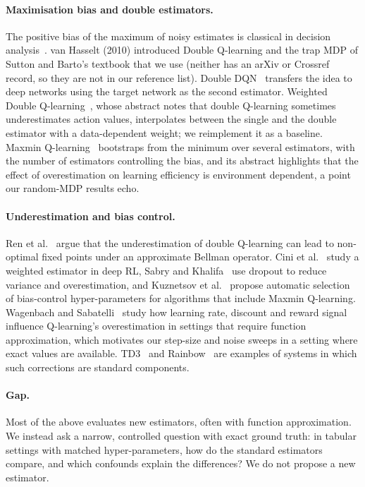 \paragraph{Maximisation bias and double estimators.} The positive bias of the maximum of noisy estimates is classical in decision analysis~\cite{smith2006optimizer}. van Hasselt (2010) introduced Double Q-learning and the trap MDP of Sutton and Barto's textbook that we use (neither has an arXiv or Crossref record, so they are not in our reference list). Double DQN~\cite{hasselt2015deep} transfers the idea to deep networks using the target network as the second estimator. Weighted Double Q-learning~\cite{zhang2017weighted}, whose abstract notes that double Q-learning sometimes underestimates action values, interpolates between the single and the double estimator with a data-dependent weight; we reimplement it as a baseline. Maxmin Q-learning~\cite{lan2020maxmin} bootstraps from the minimum over several estimators, with the number of estimators controlling the bias, and its abstract highlights that the effect of overestimation on learning efficiency is environment dependent, a point our random-MDP results echo.

\paragraph{Underestimation and bias control.} Ren et al.~\cite{ren2021estimation} argue that the underestimation of double Q-learning can lead to non-optimal fixed points under an approximate Bellman operator. Cini et al.~\cite{cini2020deep} study a weighted estimator in deep RL, Sabry and Khalifa~\cite{sabry2019reduction} use dropout to reduce variance and overestimation, and Kuznetsov et al.~\cite{kuznetsov2021automating} propose automatic selection of bias-control hyper-parameters for algorithms that include Maxmin Q-learning. Wagenbach and Sabatelli~\cite{wagenbach2022factors} study how learning rate, discount and reward signal influence Q-learning's overestimation in settings that require function approximation, which motivates our step-size and noise sweeps in a setting where exact values are available. TD3~\cite{fujimoto2018addressing} and Rainbow~\cite{hessel2017rainbow} are examples of systems in which such corrections are standard components.

\paragraph{Gap.} Most of the above evaluates new estimators, often with function approximation. We instead ask a narrow, controlled question with exact ground truth: in tabular settings with matched hyper-parameters, how do the standard estimators compare, and which confounds explain the differences? We do not propose a new estimator.
